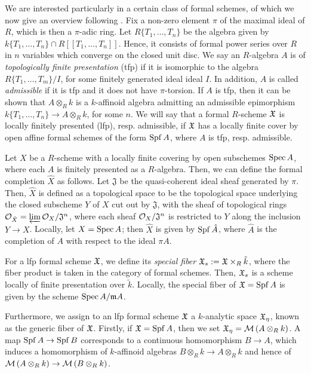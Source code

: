 We are interested particularly in a certain class of formal schemes, of which we now give an overview following \parencite[\S 5.2.1]{temk}.
Fix a non-zero element $\pi$ of the maximal ideal of $R$, which is then a $\pi$-adic ring.
Let $R\{T_1, \dots, T_n\}$ be the algebra given by $k\{T_1, \dots, T_n\} \cap R[[T_1, \dots, T_n]]$.
Hence, it consists of formal power series over $R$ in $n$ variables which converge on the closed unit disc.
We say an $R$-algebra $A$ is of \textit{topologically finite presentation} (tfp) if it is isomorphic to the algebra $R\{T_1, \dots, T_m\}/I$, for some finitely generated ideal ideal $I$.
In addition, $A$ is called \textit{admissible} if it is tfp and it does not have $\pi$-torsion.
If $A$ is tfp, then it can be shown that $A \otimes_{R} k$ is a $k$-affinoid algebra admitting an admissible epimorphism $k\{T_1, \dots, T_n\} \to A \otimes_{R} k$, for some $n$.
We will say that a formal $R$-scheme $\mathfrak{X}$ is locally finitely presented (lfp), resp. admissible, if $\mathfrak{X}$ has a locally finite cover by open affine formal schemes of the form $\operatorname{Spf} A$, where $A$ is tfp, resp. admissible.

Let $X$ be a $R$-scheme with a locally finite covering by open subschemes $\operatorname{Spec} A$, where each $A$ is finitely presented as a $R$-algebra.
Then, we can define the formal completion $\hat{X}$ as follows. 
Let $\mathfrak{J}$ be the quasi-coherent ideal sheaf generated by $\pi$.
Then, $\hat{X}$ is defined as a topological space to be the topological space underlying the closed subscheme $Y$ of $X$ cut out by $\mathfrak{J}$, with the sheaf of topological rings $\mathcal{O}_{\hat{X}} = \varprojlim \mathcal{O}_{X}/\mathfrak{J}^{n}$, where each sheaf $\mathcal{O}_{X}/\mathfrak{J}^{n}$ is restricted to $Y$ along the inclusion $Y \to X$.
Locally, let $X = \operatorname{Spec} A$; then $\hat{X}$ is given by $\operatorname{Spf} \hat{A}$, where $\hat{A}$ is the completion of $A$ with respect to the ideal $\pi A$.

For a lfp formal scheme $\mathfrak{X}$, we define its \textit{special fiber} $\mathfrak{X}_s := \mathfrak{X} \times_{R} \tilde{k}$, where the fiber product is taken in the category of formal schemes.
Then, $\mathfrak{X}_s$ is a scheme locally of finite presentation over $\tilde{k}$. 
Locally, the special fiber of $\mathfrak{X} = \operatorname{Spf} A$ is given by the scheme $\operatorname{Spec}{A/\mathfrak{m} A}$.

Furthermore, we assign to an lfp formal scheme $\mathfrak{X}$ a $k$-analytic space $\mathfrak{X}_{\eta}$, known as the generic fiber of $\mathfrak{X}$.
Firstly, if $\mathfrak{X} = \operatorname{Spf} A$, then we set $\mathfrak{X}_{\eta} = \mathcal{M}\left(A \otimes_{R} k\right)$.
A map $\operatorname{Spf} A \to \operatorname{Spf} B$ corresponds to a continuous homomorphism $B \to A$, which induces a homomorphism of $k$-affinoid algebras $B \otimes_{R} k \to A \otimes_{R} k$ and hence of $\mathcal{M}\left(A \otimes_{R} k\right) \to \mathcal{M}\left(B \otimes_{R} k\right)$.

